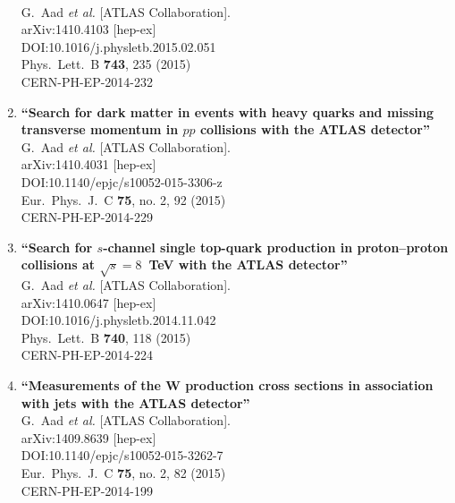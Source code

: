 \documentclass{article}
\begin{document}
\begin{enumerate}
  \\{}G.~Aad {\it et al.} [ATLAS Collaboration].
  \\{}arXiv:1410.4103 [hep-ex]
  \\{}DOI:10.1016/j.physletb.2015.02.051
  \\{}Phys.\ Lett.\ B {\bf 743}, 235 (2015)
  \\{}CERN-PH-EP-2014-232
\item%
{\bf ``Search for dark matter in events with heavy quarks and missing transverse momentum in $pp$ collisions with the ATLAS detector''}
  \\{}G.~Aad {\it et al.} [ATLAS Collaboration].
  \\{}arXiv:1410.4031 [hep-ex]
  \\{}DOI:10.1140/epjc/s10052-015-3306-z
  \\{}Eur.\ Phys.\ J.\ C {\bf 75}, no. 2, 92 (2015)
  \\{}CERN-PH-EP-2014-229
\item%
{\bf ``Search for $s$-channel single top-quark production in proton–proton collisions at $\sqrt s=8$ TeV with the ATLAS detector''}
  \\{}G.~Aad {\it et al.} [ATLAS Collaboration].
  \\{}arXiv:1410.0647 [hep-ex]
  \\{}DOI:10.1016/j.physletb.2014.11.042
  \\{}Phys.\ Lett.\ B {\bf 740}, 118 (2015)
  \\{}CERN-PH-EP-2014-224
\item%
{\bf ``Measurements of the W production cross sections in association with jets with the ATLAS detector''}
  \\{}G.~Aad {\it et al.} [ATLAS Collaboration].
  \\{}arXiv:1409.8639 [hep-ex]
  \\{}DOI:10.1140/epjc/s10052-015-3262-7
  \\{}Eur.\ Phys.\ J.\ C {\bf 75}, no. 2, 82 (2015)
  \\{}CERN-PH-EP-2014-199

\end{enumerate}
\end{document}
